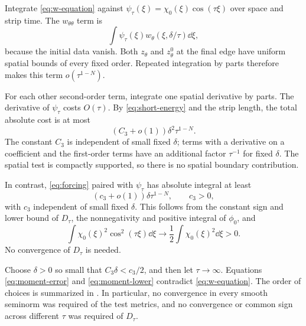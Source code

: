 Integrate \eqref{eq:w-equation} against
\(\psi_\tau(\xi)=\chi_0(\xi)\cos(\tau\xi)\) over space and strip time.
The \(w_{\theta\theta}\) term is
\[
\int\psi_\tau(\xi)w_\theta(\xi,\delta/\tau)\dd\xi,
\]
because the initial data vanish. Both \(z_\theta\) and
\(z^0_\theta\) at the final edge have uniform spatial bounds of
every fixed order. Repeated integration by parts therefore makes
this term \(o(\tau^{1-N})\).

For each other second-order term, integrate one spatial derivative
by parts. The derivative of \(\psi_\tau\) costs \(O(\tau)\).
By \eqref{eq:short-energy} and the strip length, the total
absolute cost is at most
\begin{equation}\label{eq:moment-error}
(C_3+o(1))\delta^2\tau^{1-N}.
\end{equation}
The constant \(C_3\) is independent of small fixed \(\delta\);
terms with a derivative on a coefficient and the first-order terms
have an additional factor \(\tau^{-1}\) for fixed \(\delta\).
The spatial test is compactly supported, so there is no spatial
boundary contribution.

In contrast, \eqref{eq:forcing} paired with \(\psi_\tau\)
has absolute integral at least
\begin{equation}\label{eq:moment-lower}
(c_3+o(1))\delta\tau^{1-N},
\qquad c_3>0,
\end{equation}
with \(c_3\) independent of small fixed \(\delta\).
This follows from the constant sign and lower bound of \(D_\tau\),
the nonnegativity and positive integral of \(\phi_0\), and
\[
\int\chi_0(\xi)^2\cos^2(\tau\xi)\dd\xi
\longrightarrow \frac12\int\chi_0(\xi)^2\dd\xi>0.
\]
No convergence of \(D_\tau\) is needed.

Choose \(\delta>0\) so small that \(C_3\delta<c_3/2\),
and then let \(\tau\to\infty\). Equations
\eqref{eq:moment-error} and \eqref{eq:moment-lower} contradict
\eqref{eq:w-equation}.
The order of choices is summarized in .
In particular, no convergence in every smooth seminorm was required
of the test metrics, and no convergence or common sign across
different \(\tau\) was required of \(D_\tau\).

